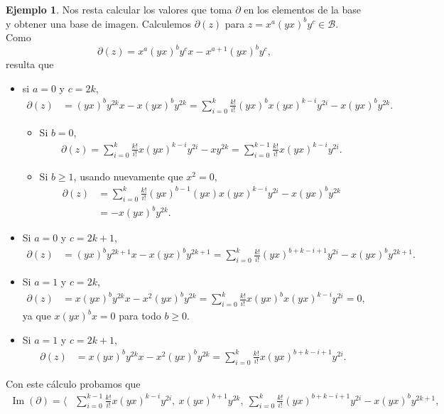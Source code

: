 \documentclass[a4paper,oneside,fleqn,11pt]{report}
\theoremstyle{definition}
\theoremstyle{definition}
\newtheorem{example}{Ejemplo}[section]
\numberwithin{prop}{subsection}
\DeclareMathOperator\Ima{Im}
\begin{document}
\begin{example}
Nos resta calcular los valores que toma $\partial$ en los elementos de la base y obtener una base de imagen.
Calculemos $\partial(z)$ para $z = x^a(yx)^by^c \in \mathcal{B}$. Como \[\partial(z) = x^a(yx)^by^cx - x^{a + 1}(yx)^by^c,\] resulta que
\begin{itemize}
\item si $a = 0$ y $c = 2k$,
	\begin{align*}
		\partial(z) &= (yx)^by^{2k}x - x(yx)^by^{2k} = \sum_{i = 0}^k\frac{k!}{i!}(yx)^bx(yx)^{k - i}y^{2i} - x(yx)^by^{2k}.
	\end{align*}
	\begin{itemize}
	\item Si $b = 0$,
		\begin{align*}
			\partial(z) = \sum_{i = 0}^k\frac{k!}{i!}x(yx)^{k - i}y^{2i} - xy^{2k} = \sum_{i = 0}^{k - 1}\frac{k!}{i!}x(yx)^{k - i}y^{2i}.
		\end{align*}
	\item Si $b \geq 1$, usando nuevamente que $x^2 = 0,$
		\begin{align*}
			\partial(z) &= \sum_{i = 0}^k\frac{k!}{i!}(yx)^{b-1}(yx)x(yx)^{k - i}y^{2i} - x(yx)^by^{2k} \\
			&=  -x(yx)^by^{2k}.
		\end{align*}
	\end{itemize}
\item Si $a = 0$ y $c = 2k + 1$,
	\begin{align*}
		\partial(z) &= (yx)^by^{2k + 1}x - x(yx)^by^{2k + 1}
			= \sum_{i = 0}^k\frac{k!}{i!}(yx)^{b + k - i + 1}y^{2i} - x(yx)^by^{2k + 1}.
	\end{align*}
\item Si $a = 1$ y  $c = 2k$,
	\begin{align*}
		\partial(z) &= x(yx)^by^{2k}x - x^2(yx)^by^{2k} 
			= \sum_{i = 0}^k\frac{k!}{i!}x(yx)^bx(yx)^{k - i}y^{2i} = 0,
	\end{align*}
ya que 	$x(yx)^bx = 0$ para todo $b \geq 0$.
\item Si $a = 1$ y  $c = 2k + 1$,
	\begin{align*}
		\partial(z) &= x(yx)^by^{2k}x - x^2(yx)^by^{2k} = \sum_{i = 0}^k\frac{k!}{i!}x(yx)^{b + k - i + 1}y^{2i}.
	\end{align*}
\end{itemize}
Con este cálculo probamos que
\begin{align*}
	\Ima(\partial) = \Bigg\langle & \sum_{i = 0}^{k - 1}\frac{k!}{i!}x(yx)^{k - i}y^{2i},
		\ x(yx)^{b + 1}y^{2k},
		\ \sum_{i = 0}^k\frac{k!}{i!}(yx)^{b + k - i + 1}y^{2i} - x(yx)^by^{2k + 1}, \\

\end{align*}
\end{example}
\end{document}
